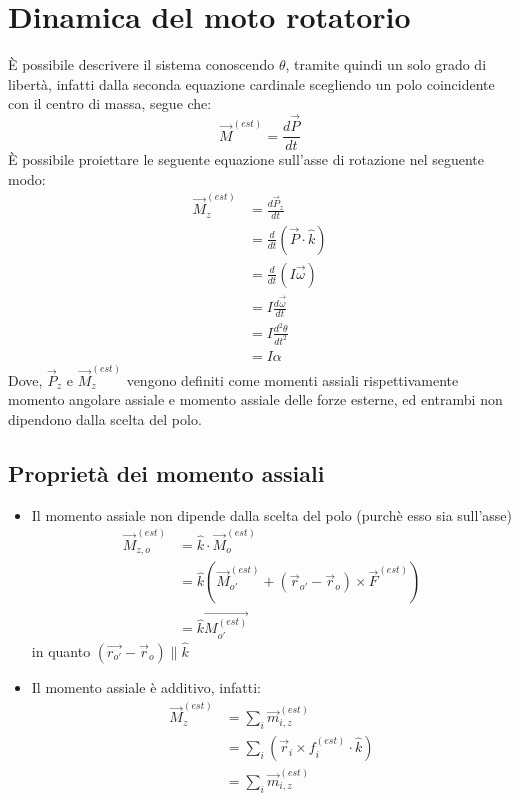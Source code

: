 \documentclass[11pt, a4paper, openright]{book}
\theoremstyle{plain}
\theoremstyle{definition}
\begin{document}
\section{Dinamica del moto rotatorio}
È possibile descrivere il sistema conoscendo $\theta$, tramite quindi un solo grado di libertà, infatti dalla seconda equazione cardinale scegliendo un polo coincidente con il centro di massa, segue che:
\begin{equation}
    \vec{M}^{(est)} = \frac{d\vec{P}}{dt}
\end{equation} 
È possibile proiettare le seguente equazione sull'asse di rotazione nel seguente modo:
\begin{align}
    \vec{M}_z^{(est)} & = \frac{d\vec{P}_z}{dt} \\
    & = \frac{d}{dt}(\vec{P} \cdot \hat{k}) \\
    & = \frac{d}{dt}(I\vec{\omega}) \\
    & = I \frac{d\vec{\omega}}{dt} \\
    & = I \frac{d^2 \theta}{dt^2} \\
    & = I\alpha
\end{align}
Dove, $\vec{P}_z$ e $\vec{M}_z^{(est)}$ vengono definiti come momenti assiali rispettivamente momento angolare assiale e momento assiale delle forze esterne, ed entrambi non dipendono dalla scelta del polo.

\subsection{Proprietà dei momento assiali}

\begin{itemize}
    \item Il momento assiale non dipende dalla scelta del polo (purchè esso sia sull'asse)
    \begin{align}
        \vec{M}_{z, o}^{(est)} & = \hat{k} \cdot \vec{M}_o^{(est)} \\
        & = \hat{k} (\vec{M}_{o'}^{(est)} + (\vec{r}_{o'} - \vec{r}_o) \times \vec{F}^{(est)}) \\
        & = \hat{k} \vec{M_{o'}^{(est)}}
    \end{align}
    in quanto $(\vec{r_{o'}} - \vec{r}_o) \parallel \hat{k}$
    \item Il momento assiale è additivo, infatti:
    \begin{align}
        \vec{M}_z^{(est)} & = \sum_i \vec{m}_{i,z}^{(est)} \\
        & = \sum_i (\vec{r}_i \times f_i^{(est)} \cdot \hat{k}) \\
        & = \sum_i \vec{m}_{i,z}^{(est)} 
    \end{align}
\end{itemize}
\end{document}
